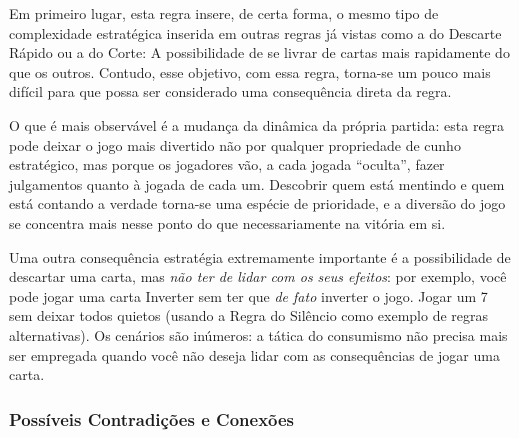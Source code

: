 Em primeiro lugar, esta regra insere, de certa forma, o mesmo tipo de complexidade estratégica inserida em outras regras já vistas como a do Descarte Rápido ou a do Corte: A possibilidade de se livrar de cartas mais rapidamente do que os outros. Contudo, esse objetivo, com essa regra, torna-se um pouco mais difícil para que possa ser considerado uma consequência direta da regra.

O que é mais observável é a mudança da dinâmica da própria partida: esta regra pode deixar o jogo mais divertido não por qualquer propriedade de cunho estratégico, mas porque os jogadores vão, a cada jogada ``oculta'', fazer julgamentos quanto à jogada de cada um. Descobrir quem está mentindo e quem está contando a verdade torna-se uma espécie de prioridade, e a diversão do jogo se concentra mais nesse ponto do que necessariamente na vitória em si.

Uma outra consequência estratégia extremamente importante é a possibilidade de descartar uma carta, mas \emph{não ter de lidar com os seus efeitos}: por exemplo, você pode jogar uma carta Inverter sem ter que \emph{de fato} inverter o jogo. Jogar um 7 sem deixar todos quietos (usando a Regra do Silêncio como exemplo de regras alternativas). Os cenários são inúmeros: a tática do consumismo não precisa mais ser empregada quando você não deseja lidar com as consequências de jogar uma carta.

\subsubsection{Possíveis Contradições e Conexões}

